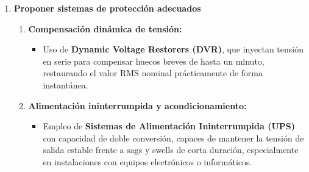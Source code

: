 \documentclass{article}
\begin{document}
\begin{enumerate}
\begin{itemize}
    \item En la fase de \textbf{sobretensión}, el exceso de tensión RMS puede originar:
    \begin{itemize}
        \item Sobreesfuerzo dieléctrico en condensadores y devanados de transformadores.
        \item Aumento de pérdidas por efecto Joule y riesgo de envejecimiento prematuro de los aislamientos.
        \item Corrientes elevadas en cargas no lineales o fuentes conmutadas, pudiendo dañar los semiconductores de potencia.
    \end{itemize}

    Además, la sucesión inmediata de ambos fenómenos —caída seguida de elevación— puede resultar especialmente crítica, ya que los equipos se ven primero privados de energía y posteriormente sometidos a una sobretensión justo en la etapa de reconexión.
\end{itemize}

Por tanto, se concluye que este tipo de evento podría provocar desde \textit{paradas de proceso y reinicios no deseados} hasta \textit{fallos de aislamiento o daños electrónicos}, dependiendo de la sensibilidad de las cargas y la capacidad de filtrado o compensación instalada.

    \item \textbf{Proponer sistemas de protección adecuados} \\

\begin{enumerate}
    \item \textbf{Compensación dinámica de tensión:}
    \begin{itemize}
        \item Uso de \textbf{Dynamic Voltage Restorers (DVR)}, que inyectan tensión en serie para compensar huecos breves de hasta un minuto, restaurando el valor RMS nominal prácticamente de forma instantánea.
    \end{itemize}

    \item \textbf{Alimentación ininterrumpida y acondicionamiento:}
    \begin{itemize}
        \item Empleo de \textbf{Sistemas de Alimentación Ininterrumpida (UPS)} con capacidad de doble conversión, capaces de mantener la tensión de salida estable frente a sags y swells de corta duración, especialmente en instalaciones con equipos electrónicos o informáticos.
    \end{itemize}


\end{enumerate}
\end{enumerate}
\end{document}
